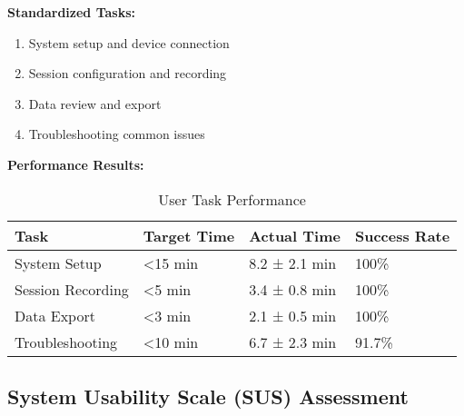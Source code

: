 \textbf{Standardized Tasks:}
\begin{enumerate}
\item System setup and device connection
\item Session configuration and recording
\item Data review and export
\item Troubleshooting common issues
\end{enumerate}

\textbf{Performance Results:}
\begin{table}[htbp]
\centering
\caption{User Task Performance}
\begin{tabular}{|l|l|l|l|}
\hline
\textbf{Task} & \textbf{Target Time} & \textbf{Actual Time} & \textbf{Success Rate} \\
\hline
System Setup & <15 min & 8.2 ± 2.1 min & 100\% \\
Session Recording & <5 min & 3.4 ± 0.8 min & 100\% \\
Data Export & <3 min & 2.1 ± 0.5 min & 100\% \\
Troubleshooting & <10 min & 6.7 ± 2.3 min & 91.7\% \\
\hline
\end{tabular}
\end{table}

\subsection{System Usability Scale (SUS) Assessment}

